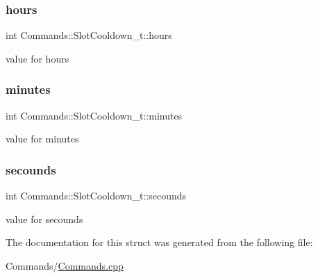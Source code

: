 \subsubsection{\texorpdfstring{hours}{hours}}
{\footnotesize\ttfamily int Commands\+::\+Slot\+Cooldown\+\_\+t\+::hours}



value for hours 

\mbox{\label{struct_commands_1_1_slot_cooldown__t_a4d1e1f8e9bfdfc25013eb07393e37b52}} 
\subsubsection{\texorpdfstring{minutes}{minutes}}
{\footnotesize\ttfamily int Commands\+::\+Slot\+Cooldown\+\_\+t\+::minutes}



value for minutes 

\mbox{\label{struct_commands_1_1_slot_cooldown__t_a4ac1a455c45218e842847bb79c514f72}} 
\subsubsection{\texorpdfstring{secounds}{secounds}}
{\footnotesize\ttfamily int Commands\+::\+Slot\+Cooldown\+\_\+t\+::secounds}



value for secounds 



The documentation for this struct was generated from the following file\+:\begin{DoxyCompactItemize}
\item 
Commands/\mbox{\hyperlink{_commands_8cpp}{Commands.\+cpp}}\end{DoxyCompactItemize}
